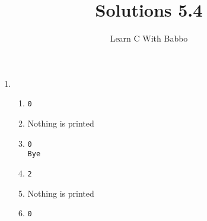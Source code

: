 \documentclass{article}
\begin{document}
\title{Solutions 5.4}
\author{Learn C With Babbo}
\date{}
\maketitle

\begin{enumerate}

\item
\begin{enumerate}

\item
\begin{lstlisting}[style=CStyle]
0
\end{lstlisting}

\item Nothing is printed

\item
\begin{lstlisting}[style=CStyle]
0
Bye
\end{lstlisting}

\item
\begin{lstlisting}[style=CStyle]
2
\end{lstlisting}

\item Nothing is printed

\item
\begin{lstlisting}[style=CStyle]
0
\end{lstlisting}

\end{enumerate}
\end{enumerate}
\end{document}
